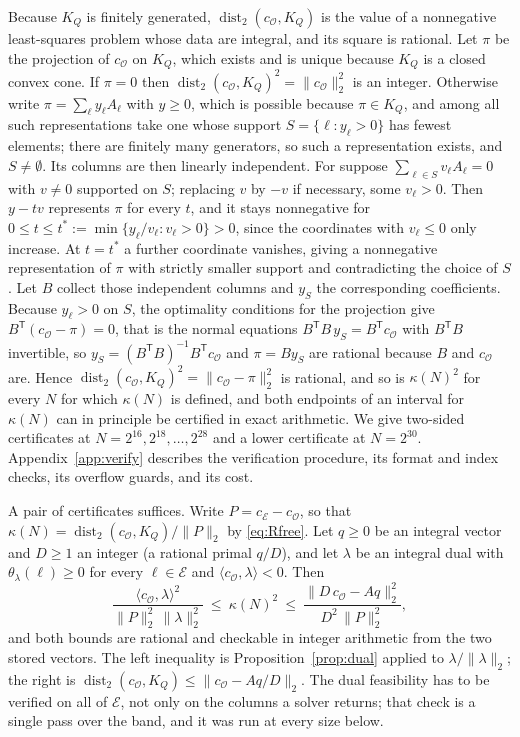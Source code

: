 \documentclass[11pt,a4paper]{article}
\theoremstyle{plain}
\theoremstyle{definition}
\theoremstyle{remark}
\DeclareMathOperator{\dist}{dist}
\newcommand{\vB}{\mathcal{E}}
\newcommand{\vR}{\mathcal{O}}
\begin{document}
Because $K_{Q}$ is finitely generated, $\dist_{2}(c_{\vR},K_{Q})$ is the value of a nonnegative
least-squares problem whose data are integral, and its square is rational. Let $\pi$ be the projection
of $c_{\vR}$ on $K_{Q}$, which exists and is unique because $K_{Q}$ is a closed convex cone. If
$\pi=0$ then $\dist_{2}(c_{\vR},K_{Q})^{2}=\|c_{\vR}\|_{2}^{2}$ is an integer. Otherwise write
$\pi=\sum_{\ell}y_{\ell}A_{\ell}$ with $y\ge0$, which is possible because $\pi\in K_{Q}$, and among
all such representations take one whose support $S=\{\ell:y_{\ell}>0\}$ has fewest elements; there are
finitely many generators, so such a representation exists, and $S\neq\emptyset$. Its columns are then
linearly independent. For suppose $\sum_{\ell\in S}v_{\ell}A_{\ell}=0$ with $v\neq0$ supported on $S$;
replacing $v$ by $-v$ if necessary, some $v_{\ell}>0$. Then $y-tv$ represents $\pi$ for every $t$, and
it stays nonnegative for $0\le t\le t^{*}:=\min\{y_{\ell}/v_{\ell}:v_{\ell}>0\}>0$, since the
coordinates with $v_{\ell}\le0$ only increase. At $t=t^{*}$ a further coordinate vanishes, giving a
nonnegative representation of $\pi$ with strictly smaller support and contradicting the choice of $S$.
Let $B$ collect those independent columns and $y_{S}$ the corresponding coefficients. Because
$y_{\ell}>0$ on $S$, the optimality conditions for the projection give
$B^{\mathsf T}(c_{\vR}-\pi)=0$, that is the normal equations
$B^{\mathsf T}B\,y_{S}=B^{\mathsf T}c_{\vR}$ with $B^{\mathsf T}B$ invertible, so
$y_{S}=(B^{\mathsf T}B)^{-1}B^{\mathsf T}c_{\vR}$ and $\pi=By_{S}$ are rational because $B$ and
$c_{\vR}$ are. Hence $\dist_{2}(c_{\vR},K_{Q})^{2}=\|c_{\vR}-\pi\|_{2}^{2}$ is rational, and so is
$\kappa(N)^{2}$ for every $N$ for which $\kappa(N)$ is defined, and both endpoints of an
interval for $\kappa(N)$ can in principle be certified in exact arithmetic. We give two-sided
certificates at $N=2^{16},2^{18},\dots,2^{28}$ and a lower certificate at $N=2^{30}$.
Appendix~\ref{app:verify} describes the verification procedure, its format and index checks, its
overflow guards, and its cost.

A pair of certificates suffices. Write $P=c_{\vB}-c_{\vR}$, so that $\kappa(N)=\dist_{2}(c_{\vR},K_{Q})/\|P\|_{2}$
by \eqref{eq:Rfree}. Let $q\ge0$ be an integral vector and $D\ge1$ an integer (a rational primal $q/D$),
and let $\lambda$ be an integral dual with $\theta_{\lambda}(\ell)\ge0$ for every $\ell\in\vB$ and
$\langle c_{\vR},\lambda\rangle<0$. Then
\begin{equation}\label{eq:cert}
  \frac{\langle c_{\vR},\lambda\rangle^{2}}{\|P\|_{2}^{2}\,\|\lambda\|_{2}^{2}}
  \ \le\ \kappa(N)^{2}\ \le\ \frac{\|D\,c_{\vR}-Aq\|_{2}^{2}}{D^{2}\,\|P\|_{2}^{2}} ,
\end{equation}
and both bounds are rational and checkable in integer arithmetic from the two stored vectors. The left
inequality is Proposition~\ref{prop:dual} applied to $\lambda/\|\lambda\|_{2}$; the right is
$\dist_{2}(c_{\vR},K_{Q})\le\|c_{\vR}-Aq/D\|_{2}$. The dual feasibility has to be verified on all of
$\vB$, not only on the columns a solver returns; that check is a single pass over the band, and it
was run at every size below.
\end{document}
